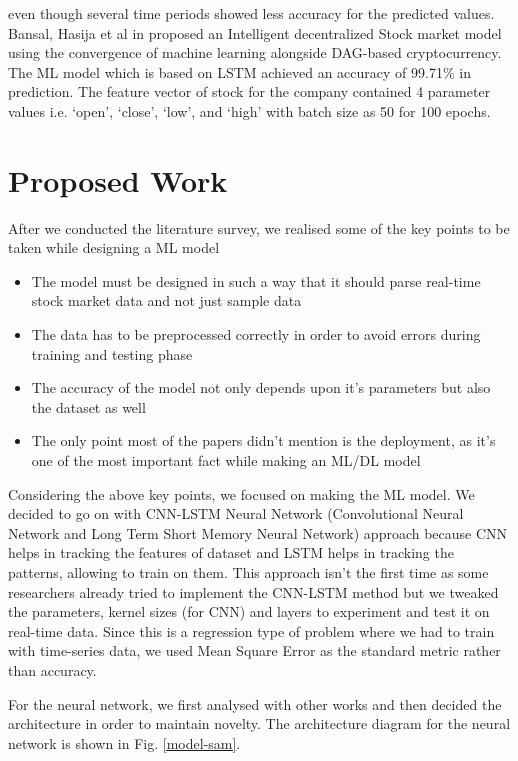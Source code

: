 \documentclass[conference]{IEEEtran}
\begin{document}
even though several time periods showed less accuracy for the predicted values. Bansal, Hasija et al in \cite{b9} proposed an Intelligent decentralized Stock market model using the convergence of machine learning alongside DAG-based cryptocurrency. The ML model which is based on LSTM achieved an accuracy of 99.71\%  in prediction. The feature vector of stock for the company contained 4 parameter values i.e. ‘open’, ‘close’, ‘low’, and ‘high’ with batch size as 50 for 100 epochs.  


\section{Proposed Work}
After we conducted the literature survey, we realised some of the key points to be taken while designing a ML model
\begin{itemize}
\item The model must be designed in such a way that it should parse real-time stock market data and not just sample data
\item The data has to be preprocessed correctly in order to avoid errors during training and testing phase
\item The accuracy of the model not only depends upon it's parameters but also the dataset as well
\item The only point most of the papers didn't mention is the deployment, as it's one of the most important fact while making an ML/DL model
\end{itemize}
Considering the above key points, we focused on making the ML model. We decided to go on with CNN-LSTM Neural Network (Convolutional Neural Network and Long Term Short Memory Neural Network) approach because CNN helps in tracking the features of dataset and LSTM helps in tracking the patterns, allowing to train on them. This approach isn't the first time as some researchers already tried to implement the CNN-LSTM method but we tweaked the parameters, kernel sizes (for CNN) and layers to experiment and test it on real-time data. Since this is a regression type of problem where we had to train with time-series data, we used Mean Square Error as the standard metric rather than accuracy.

For the neural network, we first analysed with other works and then decided the architecture in order to maintain novelty. The architecture diagram for the neural network is shown in Fig. \ref{model-sam}.
\end{document}
